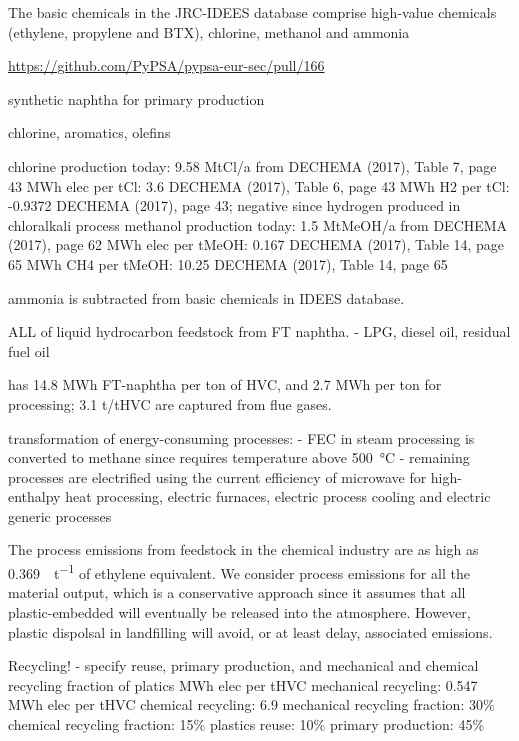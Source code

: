 The basic chemicals in the JRC-IDEES database comprise high-value chemicals (ethylene, propylene and BTX), chlorine, methanol and ammonia

\url{https://github.com/PyPSA/pypsa-eur-sec/pull/166}

synthetic naphtha for primary production

chlorine, aromatics, olefins

chlorine production today: 9.58 MtCl/a from DECHEMA (2017), Table 7, page 43
MWh elec per tCl: 3.6 DECHEMA (2017), Table 6, page 43
MWh H2 per tCl: -0.9372 DECHEMA (2017), page 43; negative since hydrogen produced in chloralkali process
methanol production today: 1.5 MtMeOH/a from DECHEMA (2017), page 62
MWh elec per tMeOH: 0.167 DECHEMA (2017), Table 14, page 65
MWh CH4 per tMeOH: 10.25 DECHEMA (2017), Table 14, page 65

ammonia is subtracted from basic chemicals in IDEES database.

ALL of liquid hydrocarbon feedstock from FT naphtha.
- LPG, diesel oil, residual fuel oil


 has 14.8 MWh FT-naphtha per ton of HVC, and 2.7 MWh per
ton for processing; 3.1 t\co/tHVC are captured from flue gases.

transformation of energy-consuming processes:
- FEC in steam processing is converted to methane since requires temperature above \SI{500}{\celsius} 
- remaining processes are electrified using the current efficiency  of microwave for high-enthalpy heat processing,
electric furnaces, electric process cooling and electric generic processes

The process emissions from feedstock in the chemical industry are as high as
\SI{0.369}{\tco\per\tonne} of ethylene equivalent. We consider process emissions
for all the material output, which is a conservative approach since it assumes
that all plastic-embedded \co will eventually be released into the atmosphere.
However, plastic dispolsal in landfilling will avoid, or at least delay,
associated \co emissions.

Recycling!
- specify reuse, primary production, and mechanical and chemical recycling
fraction of platics
MWh elec per tHVC mechanical recycling: 0.547 %
MWh elec per tHVC chemical recycling: 6.9 %
mechanical recycling fraction: 30\%
chemical recycling fraction: 15\%
plastics reuse: 10\%
primary production: 45\%

